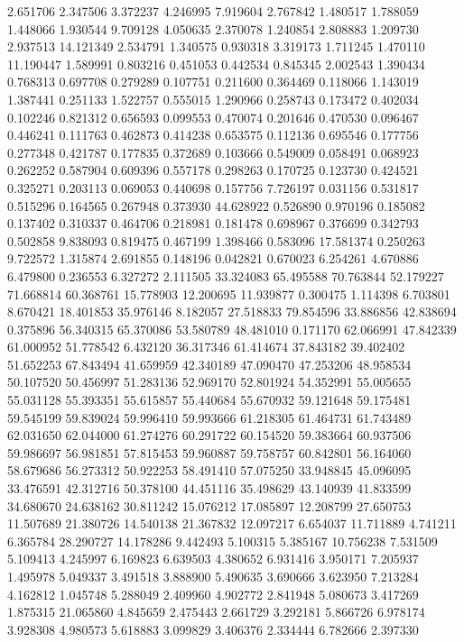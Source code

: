 2.651706
2.347506
3.372237
4.246995
7.919604
2.767842
1.480517
1.788059
1.448066
1.930544
9.709128
4.050635
2.370078
1.240854
2.808883
1.209730
2.937513
14.121349
2.534791
1.340575
0.930318
3.319173
1.711245
1.470110
11.190447
1.589991
0.803216
0.451053
0.442534
0.845345
2.002543
1.390434
0.768313
0.697708
0.279289
0.107751
0.211600
0.364469
0.118066
1.143019
1.387441
0.251133
1.522757
0.555015
1.290966
0.258743
0.173472
0.402034
0.102246
0.821312
0.656593
0.099553
0.470074
0.201646
0.470530
0.096467
0.446241
0.111763
0.462873
0.414238
0.653575
0.112136
0.695546
0.177756
0.277348
0.421787
0.177835
0.372689
0.103666
0.549009
0.058491
0.068923
0.262252
0.587904
0.609396
0.557178
0.298263
0.170725
0.123730
0.424521
0.325271
0.203113
0.069053
0.440698
0.157756
7.726197
0.031156
0.531817
0.515296
0.164565
0.267948
0.373930
44.628922
0.526890
0.970196
0.185082
0.137402
0.310337
0.464706
0.218981
0.181478
0.698967
0.376699
0.342793
0.502858
9.838093
0.819475
0.467199
1.398466
0.583096
17.581374
0.250263
9.722572
1.315874
2.691855
0.148196
0.042821
0.670023
6.254261
4.670886
6.479800
0.236553
6.327272
2.111505
33.324083
65.495588
70.763844
52.179227
71.668814
60.368761
15.778903
12.200695
11.939877
0.300475
1.114398
6.703801
8.670421
18.401853
35.976146
8.182057
27.518833
79.854596
33.886856
42.838694
0.375896
56.340315
65.370086
53.580789
48.481010
0.171170
62.066991
47.842339
61.000952
51.778542
6.432120
36.317346
61.414674
37.843182
39.402402
51.652253
67.843494
41.659959
42.340189
47.090470
47.253206
48.958534
50.107520
50.456997
51.283136
52.969170
52.801924
54.352991
55.005655
55.031128
55.393351
55.615857
55.440684
55.670932
59.121648
59.175481
59.545199
59.839024
59.996410
59.993666
61.218305
61.464731
61.743489
62.031650
62.044000
61.274276
60.291722
60.154520
59.383664
60.937506
59.986697
56.981851
57.815453
59.960887
59.758757
60.842801
56.164060
58.679686
56.273312
50.922253
58.491410
57.075250
33.948845
45.096095
33.476591
42.312716
50.378100
44.451116
35.498629
43.140939
41.833599
34.680670
24.638162
30.811242
15.076212
17.085897
12.208799
27.650753
11.507689
21.380726
14.540138
21.367832
12.097217
6.654037
11.711889
4.741211
6.365784
28.290727
14.178286
9.442493
5.100315
5.385167
10.756238
7.531509
5.109413
4.245997
6.169823
6.639503
4.380652
6.931416
3.950171
7.205937
1.495978
5.049337
3.491518
3.888900
5.490635
3.690666
3.623950
7.213284
4.162812
1.045748
5.288049
2.409960
4.902772
2.841948
5.080673
3.417269
1.875315
21.065860
4.845659
2.475443
2.661729
3.292181
5.866726
6.978174
3.928308
4.980573
5.618883
3.099829
3.406376
2.334444
6.782666
2.397330
